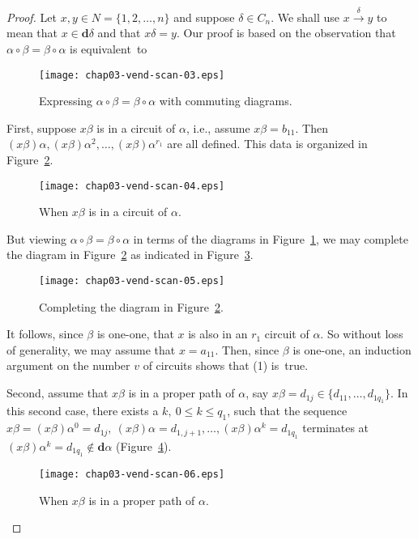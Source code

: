 \documentclass{surv-l}
\numberwithin{equation}{section}
\numberwithin{table}{section}
\numberwithin{figure}{section}
\theoremstyle{plain}
\theoremstyle{definition}
\begin{document}
\begin{proof} Let $x, y\in N=\{1,2,\ldots, n\}$ and suppose $\delta\in
C_{n}$. We shall use $x\xrightarrow{\delta} y$ to mean that $ x\in
\mathbf{d}\delta$ and that $x\delta=y$. Our proof is based on the
observation that $\alpha\circ\beta=\beta \circ\alpha$ is
equivalent~to
\setcounter{figure}{1}
\begin{figure}[!h]
\texttt{[image: chap03-vend-scan-03.eps]}
\caption{Expressing $\alpha \circ\beta=\beta \circ\alpha$ with commuting
diagrams.}\label{fig3.10.2}
\end{figure}

\noindent First, suppose $x\beta$ is in a circuit of $\alpha$, i.e., assume
$x\beta=b_{11}$. Then $(x\beta)\alpha,(x\beta)\alpha^{2},\ldots, (x\beta)\alpha^{r_{1}}$ are all defined. This data is organized in
Figure~\ref{fig3.10.3}.

\begin{figure}[!h]
\texttt{[image: chap03-vend-scan-04.eps]}
\caption{When $ x\beta$ is in a circuit of $\alpha$.}\label{fig3.10.3}
\end{figure}

\noindent But viewing $\alpha \circ\beta=\beta \circ\alpha$ in terms of the
diagrams in Figure~\ref{fig3.10.2}, we may complete the diagram in
Figure~\ref{fig3.10.3} as indicated in Figure~\ref{fig3.10.4}.

\begin{figure}[!h]
\texttt{[image: chap03-vend-scan-05.eps]}
\caption{Completing the diagram in Figure~\ref{fig3.10.3}.}\label{fig3.10.4}
\end{figure}

\noindent It follows, since $\beta$ is one-one, that $x$ is also in an
$r_{1}$ circuit of $\alpha$. So without loss of generality, we may
assume that $x=a_{11}$. Then, since $\beta$ is one-one, an
induction argument on the number $v$ of circuits shows that (1)
is~true.

Second, assume that $ x\beta$ is in a proper path of $\alpha$, say
$x\beta=d_{1j}\in\{d_{11},\ldots,d_{1q_{1}}\}$. In this second
case, there exists a $k,\ 0\leq k\leq q_{1}$, such that the
sequence $x\beta=(x\beta)\alpha^{0}=d_{1j},\
(x\beta)\alpha=d_{1,j+1},\ldots, (x\beta)\alpha^{k}=d_{1q_{1}}$
terminates at $(x\beta)\alpha^{k}=d_{1q_{1}}\not\in
\mathbf{d}\alpha$ (Figure~\ref{fig3.10.5}).

\begin{figure}[!h]
\texttt{[image: chap03-vend-scan-06.eps]}
\caption{When $ x\beta$ is in a proper path of $\alpha$.}\label{fig3.10.5}
\end{figure}


\end{proof}
\end{document}
